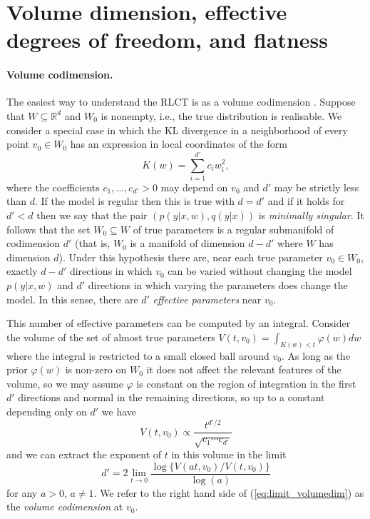 \documentclass[11pt]{article}
\def\be{\begin{equation}}
\def\ee{\end{equation}}
\numberwithin{equation}{section}
\theoremstyle{plain}
\theoremstyle{definition}
\begin{document}
\section{Volume dimension, effective degrees of freedom, and flatness}
\label{section:no_flat_minima}

\paragraph{Volume codimension.} The easiest way to understand the RLCT is as a volume codimension \citep[Theorem 7.1]{watanabe_algebraic_2009}.  Suppose that $W \subseteq \mathbb{R}^d$ and $W_0$ is nonempty, i.e., the true distribution is realisable. We consider a special case in which the KL divergence in a neighborhood of every point $v_0 \in W_0$ has an expression in local coordinates of the form
\begin{equation}\label{eq:local_Kw}
	K(w) = \sum_{i=1}^{d'} c_i w_i^2,
\end{equation} %
where the coefficients $c_1,\ldots,c_{d'} > 0$ may depend on $v_0$ and $d'$ may be strictly less than $d$. If the model is regular then this is true with $d = d'$ and if it holds for $d' < d$ then we say that the pair $(p(y|x,w),q(y|x))$ is \emph{minimally singular}. It follows that the set $W_0 \subseteq W$ of true parameters is a regular submanifold of codimension $d'$ (that is, $W_0$ is a manifold of dimension $d - d'$ where $W$ has dimension $d$). Under this hypothesis there are, near each true parameter $v_0 \in W_0$, exactly $d - d'$ directions in which $v_0$ can be varied without changing the model $p(y|x,w)$ and $d'$ directions in which varying the parameters does change the model. In this sense, there are $d'$ \emph{effective parameters} near $v_0$. 

This number of effective parameters can be computed by an integral. Consider the volume of the set of almost true parameters
$
V(t,v_0) = \int_{K(w) < t} \varphi(w) dw
$
where the integral is restricted to a small closed ball around $v_0$. As long as the prior $\varphi(w)$ is non-zero on $W_0$ it does not affect the relevant features of the volume, so we may assume $\varphi$ is constant on the region of integration in the first $d'$ directions and normal in the remaining directions, so up to a constant depending only on $d'$ we have
\begin{equation}\label{eq:volume_singular}
	V(t,v_0) \propto  \frac{t^{d'/2}}{\sqrt{c_1 \cdots c_{d'}}}
\end{equation}
and we can extract the exponent of $t$ in this volume in the limit
\be\label{eq:limit_volumedim}
d' = 2 \lim_{t \to 0} \frac{\log\big\{V(at,v_0)/V(t,v_0)\big\}}{\log(a)}
\ee
for any $a > 0$, $a \neq 1$. We refer to the right hand side of (\ref{eq:limit_volumedim}) as the \emph{volume codimension} at $v_0$. 
\end{document}
